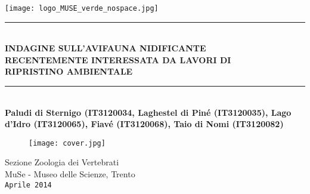 \documentclass[11pt,a4paper,twoside]{memoir}
\author{\textsl{Sezione Zoologia dei Vertebrati}}
\newcommand{\HRule}{\rule{\linewidth}{0.2mm}}
\begin{document}
\begin{center}
  \texttt{[image: logo\_MUSE\_verde\_nospace.jpg]} \\
\end{center}

\pagestyle{empty}
 \begin{center}
\vspace{15pt}
\HRule \\[0.3cm]
{\LARGE \bfseries INDAGINE SULL'AVIFAUNA NIDIFICANTE } \\[0.1cm]
{\LARGE \bfseries RECENTEMENTE INTERESSATA DA LAVORI DI }\\[0.1cm]
{\LARGE \bfseries RIPRISTINO AMBIENTALE}\\[0.1cm]
\HRule\\[0.5cm]
\textbf{Paludi di Sternigo (IT3120034, Laghestel di Piné (IT3120035), Lago d'Idro (IT3120065), Fiavé (IT3120068), Taio di Nomi (IT3120082)} \\
 \end{center}


\vspace{\fill}
 \begin{figure}[H]
\centering
\texttt{[image: cover.jpg]}
\end{figure}
\vspace{\fill}

\begin{center}
  Sezione Zoologia dei Vertebrati \\
  MuSe - Museo delle Scienze, Trento \\
  \texttt{Aprile 2014} \\
\end{center}
\end{document}
